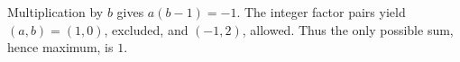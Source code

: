 Multiplication by $b$ gives $a(b-1)=-1$. The integer factor pairs yield $(a,b)=(1,0)$, excluded, and $(-1,2)$, allowed. Thus the only possible sum, hence maximum, is $\boxed1$.
